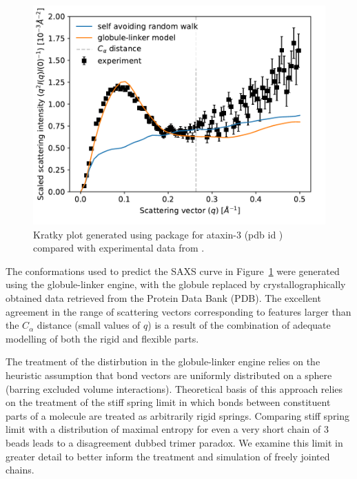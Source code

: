 \documentclass{doctoral}
\newcommand{\code}[1]{\texttt{\detokenize{#1}}}
\begin{document}
\begin{figure}[htbp]
    \centering
    \includegraphics[height=0.5\linewidth]{figures/saxs_single_bead.pdf}
    \caption{Kratky plot generated using \code{saxs_single_bead} package for {ataxin-3} (pdb id \code{1yzb}) compared with experimental data from \textcite{Sicorello_2021}.}
    \label{fig:saxs_compare}
\end{figure}

The conformations used to predict the SAXS curve in Figure~\ref{fig:saxs_compare} were generated using the globule-linker engine, with the globule replaced by crystallographically obtained data retrieved from the Protein Data Bank (PDB)\cite{rcsb_org}.
The excellent agreement in the range of scattering vectors corresponding to features larger than the $C_{\alpha}$ distance (small values of $q$) is a result of the combination of adequate modelling of both the rigid and flexible parts.

The treatment of the distirbution in the globule-linker engine relies on the heuristic assumption that bond vectors are uniformly distributed on a sphere (barring excluded volume interactions).
Theoretical basis of this approach relies on the treatment of the stiff spring limit in which bonds between constituent parts of a molecule are treated as arbitrarily rigid springs.
Comparing stiff spring limit with a distribution of maximal entropy for even a very short chain of 3 beads leads to a disagreement dubbed trimer paradox.
We examine this limit in greater detail to better inform the treatment and simulation of freely jointed chains.
\clearpage
\end{document}
